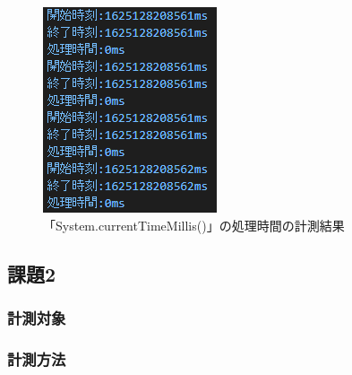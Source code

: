 \begin{itemize}
\begin{figure}[htbp]
\begin{minipage}[t]{0.5\hsize}
    \end{minipage}
    \begin{minipage}[t]{0.45\hsize}
      \centering
      \caption{「System.currentTimeMillis()」の処理時間の計測結果}
      \label{graph:4}
      \includegraphics[scale=0.9]{milltimeの結果.PNG}
    \end{minipage}
  \end{figure}

\end{itemize}


\subsection{課題2}
\subsubsection{計測対象}
\subsubsection{計測方法}